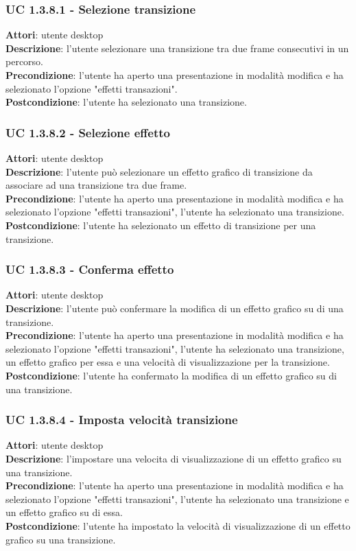 \subsubsection{UC 1.3.8.1 - Selezione transizione}{
	\label{uc1.3..8.1}
	\textbf{Attori}: utente desktop \\
	\textbf{Descrizione}: l'utente selezionare una transizione tra due frame consecutivi in un percorso. \\
	\textbf{Precondizione}: l'utente ha aperto una presentazione in modalità modifica e ha selezionato l'opzione "effetti transazioni".	\\
	\textbf{Postcondizione}: l'utente ha selezionato una transizione.	
}
\subsubsection{UC 1.3.8.2 - Selezione effetto}{
	\label{uc1.3.8.2}
	\textbf{Attori}: utente desktop \\
	\textbf{Descrizione}: l'utente può selezionare un effetto grafico di transizione da associare ad una transizione tra due frame. \\
	\textbf{Precondizione}: l'utente ha aperto una presentazione in modalità modifica e ha selezionato l'opzione "effetti transazioni", l'utente ha selezionato una transizione.	\\
	\textbf{Postcondizione}: l'utente ha selezionato un effetto di transizione per una transizione.	
}
\subsubsection{UC 1.3.8.3 - Conferma effetto}{
	\label{uc1.3.8.3}
	\textbf{Attori}: utente desktop \\
	\textbf{Descrizione}: l'utente può confermare la modifica di un effetto grafico su di una transizione. \\
	\textbf{Precondizione}: l'utente ha aperto una presentazione in modalità modifica e ha selezionato l'opzione "effetti transazioni", l'utente ha selezionato una transizione, un effetto grafico per essa e una velocità di visualizzazione per la transizione.	\\
	\textbf{Postcondizione}: l'utente ha confermato la modifica di un effetto grafico su di una transizione.
}
\subsubsection{UC 1.3.8.4 - Imposta velocità transizione}{
	\label{uc1.3..8.4}
	\textbf{Attori}: utente desktop \\
	\textbf{Descrizione}: l'impostare una velocita di visualizzazione di un effetto grafico su una transizione. \\
	\textbf{Precondizione}: l'utente ha aperto una presentazione in modalità modifica e ha selezionato l'opzione "effetti transazioni", l'utente ha selezionato una transizione e un effetto grafico su di essa.	\\
	\textbf{Postcondizione}: l'utente ha impostato la velocità di visualizzazione di un effetto grafico su una transizione.
}
